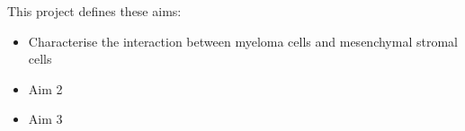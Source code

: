 \documentclass[12pt]{doctoral_thesis_uniwue}
\begin{document}




\newpage


This project defines these aims:


\begin{itemize}
    \item Characterise the interaction between myeloma cells and mesenchymal stromal cells
    \item Aim 2
    \item Aim 3

\end{itemize}

\newpage




\newpage

\newpage




\newpage





\newpage








\end{document}
